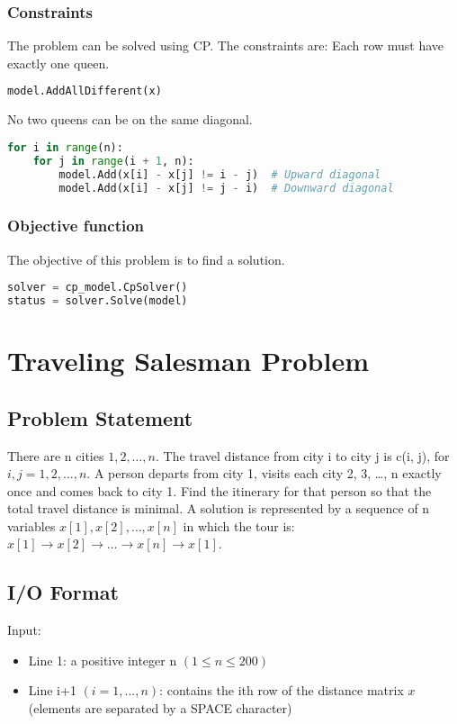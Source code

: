 \documentclass{article}
\begin{document}
\subsubsection{Constraints}
The problem can be solved using CP. The constraints are:
Each row must have exactly one queen.
\begin{lstlisting}[language=Python]
model.AddAllDifferent(x)
\end{lstlisting}
No two queens can be on the same diagonal.
\begin{lstlisting}[language=Python]
for i in range(n):
    for j in range(i + 1, n):
        model.Add(x[i] - x[j] != i - j)  # Upward diagonal
        model.Add(x[i] - x[j] != j - i)  # Downward diagonal
\end{lstlisting}

\subsubsection{Objective function}
The objective of this problem is to find a solution.
\begin{lstlisting}[language=Python]
solver = cp_model.CpSolver()
status = solver.Solve(model)
\end{lstlisting}

\pagebreak

\section{Traveling Salesman Problem}
\subsection{Problem Statement}
There are n cities $1, 2, \dots, n$. 
The travel distance from city i to city j is c(i, j), for $i, j = 1, 2, \dots, n$.  
A person departs from city 1, visits each city 2, 3, \dots, n exactly once and comes back to city 1. Find the itinerary for that person so that the total travel distance is minimal.
A solution is represented by a sequence of n variables $x[1], x[2], \dots , x[n]$ in which the tour is: $x[1] \rightarrow x[2] \rightarrow \dots \rightarrow x[n] \rightarrow x[1]$.

\subsection{I/O Format}
Input:

\begin{itemize}
    \item Line 1: a positive integer n $(1 \le n \le 200)$
    \item Line i+1 $(i = 1, . . ., n)$: contains the ith row of the distance matrix $x$ (elements are separated by a SPACE character)
\end{itemize}
\end{document}
